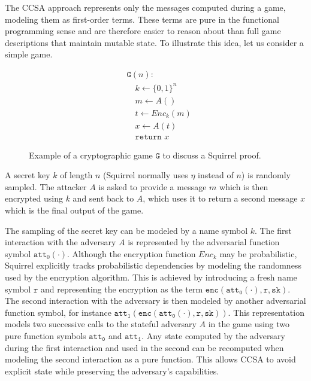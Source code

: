 The CCSA approach represents only the messages computed during a game, modeling them as first-order terms. These terms are pure in the functional programming sense and are therefore easier to reason about than full game descriptions that maintain mutable state. To illustrate this idea, let us consider a simple game.
\begin{figure}[htpb]
    \centering
    \begin{align*}
    &\mathtt{G}(n): \\
    &\quad k \gets \{0,1\}^n \\
    &\quad m \gets A() \\
    &\quad t \gets Enc_k(m) \\
    &\quad x \gets A(t) \\
    &\quad\mathtt{return}\,\, x
    \end{align*}
    \caption{Example of a cryptographic game $\mathtt{G}$ to discuss a Squirrel proof.}
    \label{fig:squirrel-sample-proof}
\end{figure}

A secret key $k$ of length $n$ (Squirrel normally uses $\eta$ instead of $n$) is randomly sampled. The attacker $A$ is asked to provide a message $m$ which is then encrypted using $k$ and sent back to $A$, which uses it to return a second message $x$ which is the final output of the game.

The sampling of the secret key can be modeled by a name symbol $k$. The first interaction with the adversary $A$ is represented by the adversarial function symbol $\mathtt{att}_0(\cdot)$. Although the encryption function $Enc_k$ may be probabilistic, Squirrel explicitly tracks probabilistic dependencies by modeling the randomness used by the encryption algorithm. This is achieved by introducing a fresh name symbol $\mathtt{r}$ and representing the encryption as the term $\mathtt{enc(att_0(\cdot),r,sk)}$. The second interaction with the adversary is then modeled by another adversarial function symbol, for instance $\mathtt{att_1(enc(att_0(\cdot),r,sk))}$. This representation models two successive calls to the stateful adversary $A$ in the game using two pure function symbols $\mathtt{att_0}$ and $\mathtt{att_1}$. Any state computed by the adversary during the first interaction and used in the second can be recomputed when modeling the second interaction as a pure function. This allows CCSA to avoid explicit state while preserving the adversary's capabilities.

